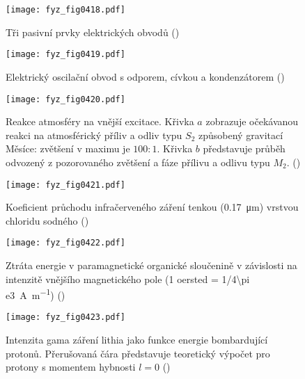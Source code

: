   \begin{figure}[ht!] %
    \centering
    \texttt{[image: fyz\_fig0418.pdf]}
    \caption{Tři pasivní prvky elektrických obvodů
             (\cite[s.~315]{Feynman01})}
    \label{fyz:fig0418}
  \end{figure}

  \begin{figure}[ht!] %
    \centering
    \texttt{[image: fyz\_fig0419.pdf]}
    \caption{Elektrický oscilační obvod s odporem, cívkou a kondenzátorem
             (\cite[s.~316]{Feynman01})}
    \label{fyz:fig0419}
  \end{figure}

  \begin{figure}[ht!] %
    \centering
    \texttt{[image: fyz\_fig0420.pdf]}
    \caption{Reakce atmosféry na vnější excitace. Křivka \(a\) zobrazuje očekávanou reakci na 
             atmosférický příliv a odliv typu \(S_2\) způsobený gravitací Měsíce: zvětšení v maximu 
             je \(100:1\). Křivka \(b\) představuje průběh odvozený z pozorovaného zvětšení a fáze 
             přílivu a odlivu typu \(M_2\). 
             (\cite[s.~318]{Feynman01})}
    \label{fyz:fig0420}
  \end{figure}

  \begin{figure}[ht!] %
    \centering
    \texttt{[image: fyz\_fig0421.pdf]}
    \caption{Koeficient průchodu infračerveného záření tenkou (\SI{0.17}{\micro\m}) vrstvou 
             chloridu sodného
             (\cite[s.~319]{Feynman01})}
    \label{fyz:fig0421}
  \end{figure}

  \begin{figure}[ht!] %
    \centering
    \texttt{[image: fyz\_fig0422.pdf]}
    \caption{Ztráta energie v paramagnetické organické sloučenině v závislosti na intenzitě 
    vnějšího magnetického pole (1 oersted = \SI{1/4\pi e3}{\ampere\per\meter})
             (\cite[s.~320]{Feynman01})}
    \label{fyz:fig0422}
  \end{figure}

  \begin{figure}[ht!] %
    \centering
    \texttt{[image: fyz\_fig0423.pdf]}
    \caption{Intenzita gama záření lithia jako funkce energie bombardující protonů. Přerušovaná 
             čára představuje teoretický výpočet pro protony s momentem hybnosti \(l=0\)
             (\cite[s.~320]{Feynman01})}
    \label{fyz:fig0423}
  \end{figure}

